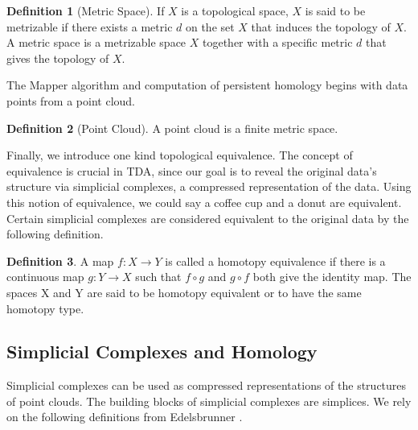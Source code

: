\documentclass[12pt]{article}
\theoremstyle{definition}
\newtheorem{definition}{Definition}
\begin{document}
\begin{definition}[Metric Space]
If $X$ is a topological space, $X$ is said to be metrizable if there exists a metric $d$ on the set $X$ that induces the topology of $X$. A metric space is a metrizable space $X$ together with a specific metric $d$ that gives the topology of $X$.
\end{definition}
The Mapper algorithm and computation of persistent homology begins with data points from a point cloud.
\begin{definition}[Point Cloud]
A point cloud is a finite metric space.
\end{definition}
Finally, we introduce one kind topological equivalence. The concept of equivalence is crucial in TDA, since our goal is to reveal the original data's structure via simplicial complexes, a compressed representation of the data. Using this notion of equivalence, we could say a coffee cup and a donut are equivalent. Certain simplicial complexes are considered equivalent to the original data by the following definition.
\begin{definition}
A map $f : X \rightarrow Y$ is called a homotopy equivalence if there is a continuous map $g : Y \rightarrow X$ such that $f \circ g$ and $g \circ f$ both give the identity map. The spaces X and Y are said to be homotopy equivalent or to have the same homotopy type. 
\end{definition}

\subsection{Simplicial Complexes and Homology}

Simplicial complexes can be used as compressed representations of the structures of point clouds. The building blocks of simplicial complexes are simplices. We rely on the following definitions from Edelsbrunner \cite{edelsbrunner2010computational}. 
\end{document}
